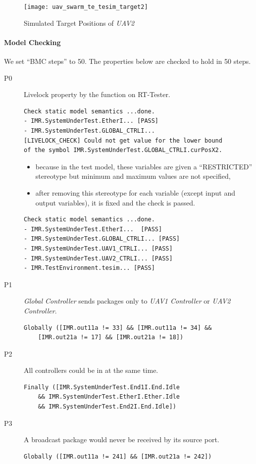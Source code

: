 \begin{figure}[htb!]
    \centering
	\texttt{[image: uav\_swarm\_te\_tesim\_target2]}
    \caption{Simulated Target Positions of \emph{UAV2}}
    \label{fig:uav_swarm_te_tesim_target2}
\end{figure}

\paragraph{Model Checking}
We set ``BMC steps'' to 50. The properties below are checked to hold in 50 steps.

\begin{description}
    \item[P0] Livelock property by the  function on RT-Tester.
\begin{verbatim}
Check static model semantics ...done.
- IMR.SystemUnderTest.EtherI... [PASS]
- IMR.SystemUnderTest.GLOBAL_CTRLI... 
[LIVELOCK_CHECK] Could not get value for the lower bound 
of the symbol IMR.SystemUnderTest.GLOBAL_CTRLI.curPosX2.
\end{verbatim}
\begin{itemize}
    \item because in the test model, these variables are given a ``RESTRICTED'' stereotype but minimum and maximum values are not specified,
    \item after removing this stereotype for each variable (except input and output variables), it is fixed and the check is passed.
\end{itemize}
\begin{verbatim}
Check static model semantics ...done.
- IMR.SystemUnderTest.EtherI...  [PASS]
- IMR.SystemUnderTest.GLOBAL_CTRLI... [PASS]
- IMR.SystemUnderTest.UAV1_CTRLI... [PASS]
- IMR.SystemUnderTest.UAV2_CTRLI... [PASS]
- IMR.TestEnvironment.tesim... [PASS]
\end{verbatim}

    \item[P1] \emph{Global Controller} sends packages only to \emph{UAV1 Controller} or \emph{UAV2 Controller}.
\begin{verbatim}
Globally ([IMR.out11a != 33] && [IMR.out11a != 34] && 
    [IMR.out21a != 17] && [IMR.out21a != 18])
\end{verbatim}

    \item[P2] All controllers could be in  at the same time.
\begin{verbatim}
Finally ([IMR.SystemUnderTest.End1I.End.Idle
    && IMR.SystemUnderTest.EtherI.Ether.Idle
    && IMR.SystemUnderTest.End2I.End.Idle])
\end{verbatim}

    \item[P3] A broadcast package would never be received by its source port.
\begin{verbatim}
Globally ([IMR.out11a != 241] && [IMR.out21a != 242])
\end{verbatim}
\end{description}

